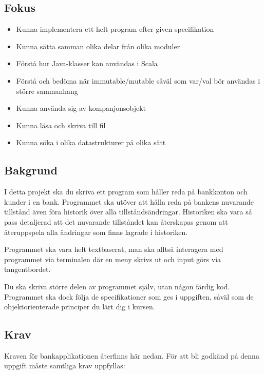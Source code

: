 

\subsection{Fokus}
\begin{itemize}[nosep,label={$\square$},leftmargin=*]
\item Kunna implementera ett helt program efter given specifikation
\item Kunna sätta samman olika delar från olika moduler
\item Förstå hur Java-klasser kan användas i Scala
\item Förstå och bedöma när immutable/mutable såväl som var/val bör användas i större sammanhang
\item Kunna använda sig av kompanjonsobjekt
\item Kunna läsa och skriva till fil
\item Kunna söka i olika datastrukturer på olika sätt
\end{itemize}

\subsection{Bakgrund}

I detta projekt ska du skriva ett program som håller reda på bankkonton och kunder i en bank. Programmet ska utöver att hålla reda på bankens nuvarande tillstånd även föra historik över alla tillståndsändringar. Historiken ska vara så pass detaljerad att det nuvarande tillståndet kan återskapas genom att återuppspela alla ändringar som finns lagrade i historiken.

Programmet ska vara helt textbaserat, man ska alltså interagera med programmet via terminalen där en meny skrivs ut och input görs via tangentbordet.

Du ska skriva större delen av programmet själv, utan någon färdig kod. Programmet ska dock följa de specifikationer som ges i uppgiften, såväl som de objektorienterade principer du lärt dig i kursen.

\subsection{Krav}

Kraven för bankapplikationen återfinns här nedan. För att bli godkänd på denna uppgift måste samtliga krav uppfyllas:

